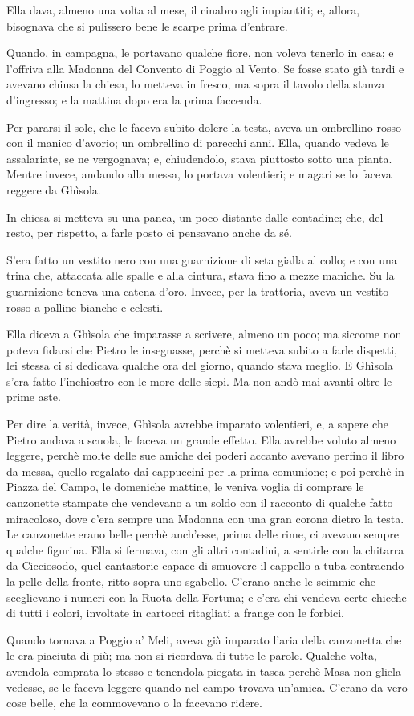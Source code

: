 Ella dava, almeno una volta al mese, il cinabro agli impiantiti; e, allora, bisognava che si pulissero bene le scarpe prima d'entrare.

Quando, in campagna, le portavano qualche fiore, non voleva tenerlo in casa; e l'offriva alla Madonna del Convento di Poggio al Vento. Se fosse stato già tardi e avevano chiusa la chiesa, lo metteva in fresco, ma sopra il tavolo della stanza d'ingresso; e la mattina dopo era la prima faccenda.

Per pararsi il sole, che le faceva subito dolere la testa, aveva un ombrellino rosso con il manico d'avorio; un ombrellino di parecchi anni. Ella, quando vedeva le assalariate, se ne vergognava; e, chiudendolo, stava piuttosto sotto una pianta. Mentre invece, andando alla messa, lo portava volentieri; e magari se lo faceva reggere da Ghìsola.

In chiesa si metteva su una panca, un poco distante dalle contadine; che, del resto, per rispetto, a farle posto ci pensavano anche da sé.

S'era fatto un vestito nero con una guarnizione di seta gialla al collo; e con una trina che, attaccata alle spalle e alla cintura, stava fino a mezze maniche. Su la guarnizione teneva una catena d'oro. Invece, per la trattoria, aveva un vestito rosso a palline bianche e celesti.

Ella diceva a Ghìsola che imparasse a scrivere, almeno un poco; ma siccome non poteva fidarsi che Pietro le insegnasse, perchè si metteva subito a farle dispetti, lei stessa ci si dedicava qualche ora del giorno, quando stava meglio. E Ghìsola s'era fatto l'inchiostro con le more delle siepi. Ma non andò mai avanti oltre le prime aste.

Per dire la verità, invece, Ghìsola avrebbe imparato volentieri, e, a sapere che Pietro andava a scuola, le faceva un grande effetto. Ella avrebbe voluto almeno leggere, perchè molte delle sue amiche dei poderi accanto avevano perfino il libro da messa, quello regalato dai cappuccini per la prima comunione; e poi perchè in Piazza del Campo, le domeniche mattine, le veniva voglia di comprare le canzonette stampate che vendevano a un soldo con il racconto di qualche fatto miracoloso, dove c'era sempre una Madonna con una gran corona dietro la testa. Le canzonette erano belle perchè anch'esse, prima delle rime, ci avevano sempre qualche figurina. Ella si fermava, con gli altri contadini, a sentirle con la chitarra da Cicciosodo, quel cantastorie capace di smuovere il cappello a tuba contraendo la pelle della fronte, ritto sopra uno sgabello. C'erano anche le scimmie che sceglievano i numeri con la Ruota della Fortuna; e c'era chi vendeva certe chicche di tutti i colori, involtate in cartocci ritagliati a frange con le forbici.

Quando tornava a Poggio a' Meli, aveva già imparato l'aria della canzonetta che le era piaciuta di più; ma non si ricordava di tutte le parole. Qualche volta, avendola comprata lo stesso e tenendola piegata in tasca perchè Masa non gliela vedesse, se le faceva leggere quando nel campo trovava un'amica. C'erano da vero cose belle, che la commovevano o la facevano ridere.
